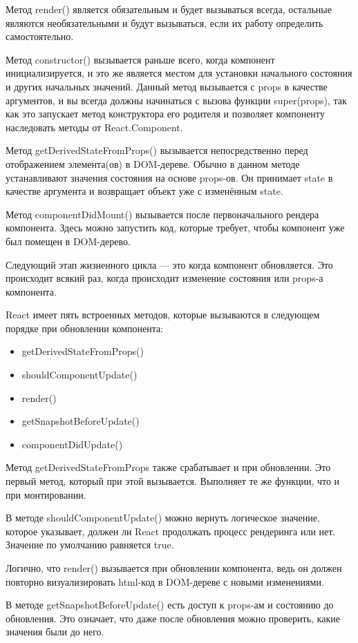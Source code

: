 \documentclass[a4paper,12pt]{diplom}
\begin{document}
Метод render() является обязательным и будет вызываться всегда, остальные являются необязательными и будут вызываться, если их работу определить самостоятельно.

Метод constructor() вызывается раньше всего, когда компонент инициализируется, и это же является местом для установки начального состояния и других начальных значений. Данный метод вызывается с props в качестве аргументов, и вы всегда должны начинаться с вызова функции super(props), так как это запускает метод конструктора его родителя и позволяет компоненту наследовать методы от React.Component.

Метод getDerivedStateFromProps() вызывается непосредственно перед отображением элемента(ов) в DOM-дереве. Обычно в данном методе устанавливают значения состояния на основе props-ов. Он принимает state в качестве аргумента и возвращает объект уже с изменённым state.

Метод componentDidMount() вызывается после первоначального рендера компонента.
Здесь можно запустить код, которые требует, чтобы компонент уже был помещен в DOM-дерево.

Следующий этап жизненного цикла — это когда компонент обновляется.
Это происходит всякий раз, когда происходит изменение состояния или props-а компонента.

React имеет пять встроенных методов, которые вызываются в следующем порядке при обновлении компонента:

\begin{itemize}
\item getDerivedStateFromProps()
\item shouldComponentUpdate()
\item render()
\item getSnapshotBeforeUpdate()
\item componentDidUpdate()
\end{itemize}

Метод getDerivedStateFromProps также срабатывает и при обновлении. Это первый метод, который при этой вызывается.
Выполняет те же функции, что и при монтировании.

В методе shouldComponentUpdate() можно вернуть логическое значение, которое указывает, должен ли React продолжать процесс рендеринга или нет.
Значение по умолчанию равняется true.

Логично, что render() вызывается при обновлении компонента, ведь он должен повторно визуализировать html-код в DOM-дереве с новыми изменениями.

В методе getSnapshotBeforeUpdate() есть доступ к props-ам и состоянию до обновления. Это означает, что даже после обновления можно проверить, какие значения были до него.
\end{document}
